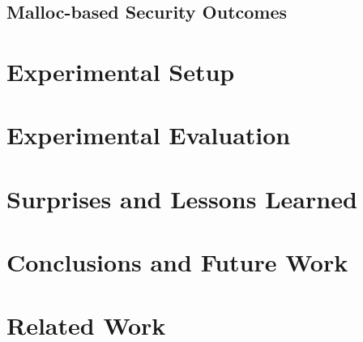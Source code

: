 \documentclass[letterpaper,11pt]{article}
\begin{document}
\subsection{Malloc-based Security Outcomes}






\section{Experimental Setup}

\subsection{}


\section{Experimental Evaluation}



\section{Surprises and Lessons Learned}
\label{lessonslearned}



\section{Conclusions and Future Work}



\clearpage
\section{Related Work}

\nocite{*}
{
}
\end{document}
